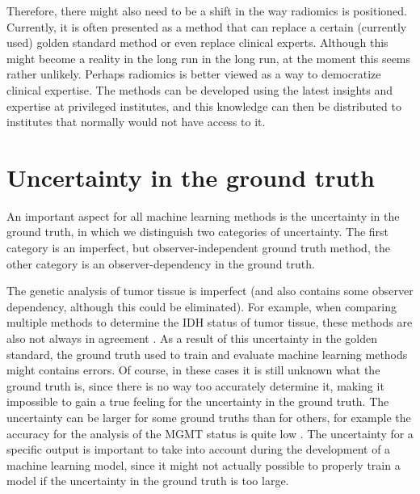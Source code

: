 Therefore, there might also need to be a shift in the way radiomics is positioned.
Currently, it is often presented as a method that can replace a certain (currently used) golden standard method or even replace clinical experts.
Although this might become a reality in the long run in the long run, at the moment this seems rather unlikely.
Perhaps radiomics is better viewed as a way to democratize clinical expertise.
The methods can be developed using the latest insights and expertise at privileged institutes, and this knowledge can then be distributed to institutes that normally would not have access to it.


\section{Uncertainty in the ground truth}

An important aspect for all machine learning methods is the uncertainty in the ground truth, in which we distinguish two categories of uncertainty.
The first category is an imperfect, but observer-independent ground truth method, the other category is an observer-dependency in the ground truth.

The genetic analysis of tumor tissue is imperfect (and also contains some observer dependency, although this could be eliminated).
For example, when comparing multiple methods to determine the \gls{IDH} status of \gls{tumor} tissue, these methods are also not always in agreement \autocite{pyo2016concordance}.
As a result of this uncertainty in the golden standard, the ground truth used to train and evaluate machine learning methods might contains errors.
Of course, in these cases it is still unknown what the  ground truth is, since there is no way too  accurately determine it, making it impossible to gain a true feeling for the uncertainty in the ground truth.
The uncertainty can be larger for some ground truths than for others, for example the accuracy for the analysis of the \gls{MGMT} status is quite low \autocite{wang2017mgmt}.
The uncertainty for a specific output is important to take into account during the development of a machine learning model, since it might not actually possible to properly train a model if the uncertainty in the ground truth is too large.

